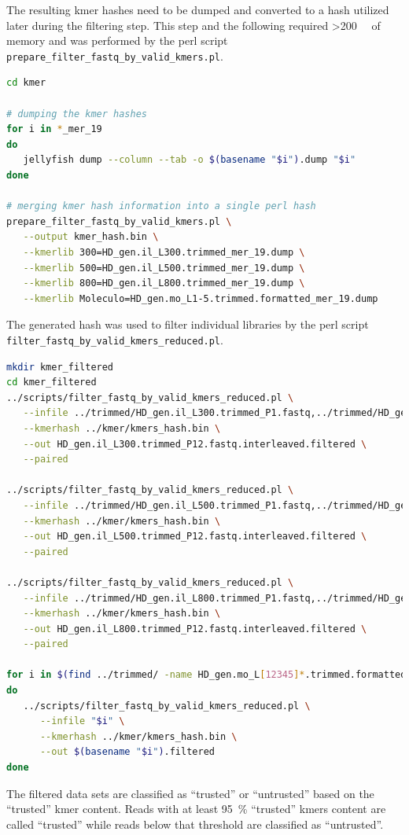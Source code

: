 \documentclass[12pt,a4paper]{scrartcl}
\begin{document}
The resulting kmer hashes need to be dumped and converted to a hash
utilized later during the filtering step. This step and the following
required \SI{>200}{\giga\byte} of memory and was performed by the perl
script \texttt{prepare\_filter\_fastq\_by\_valid\_kmers.pl}.

\begin{lstlisting}[language=bash]
cd kmer

# dumping the kmer hashes
for i in *_mer_19
do
   jellyfish dump --column --tab -o $(basename "$i").dump "$i"
done

# merging kmer hash information into a single perl hash
prepare_filter_fastq_by_valid_kmers.pl \
   --output kmer_hash.bin \
   --kmerlib 300=HD_gen.il_L300.trimmed_mer_19.dump \
   --kmerlib 500=HD_gen.il_L500.trimmed_mer_19.dump \
   --kmerlib 800=HD_gen.il_L800.trimmed_mer_19.dump \
   --kmerlib Moleculo=HD_gen.mo_L1-5.trimmed.formatted_mer_19.dump
\end{lstlisting}

The generated hash was used to filter individual libraries by the perl
script \texttt{filter\_fastq\_by\_valid\_kmers\_reduced.pl}.

\begin{lstlisting}[language=bash]
mkdir kmer_filtered
cd kmer_filtered
../scripts/filter_fastq_by_valid_kmers_reduced.pl \
   --infile ../trimmed/HD_gen.il_L300.trimmed_P1.fastq,../trimmed/HD_gen.il_L300.trimmed_P2.fastq \
   --kmerhash ../kmer/kmers_hash.bin \
   --out HD_gen.il_L300.trimmed_P12.fastq.interleaved.filtered \
   --paired

../scripts/filter_fastq_by_valid_kmers_reduced.pl \
   --infile ../trimmed/HD_gen.il_L500.trimmed_P1.fastq,../trimmed/HD_gen.il_L500.trimmed_P2.fastq \
   --kmerhash ../kmer/kmers_hash.bin \
   --out HD_gen.il_L500.trimmed_P12.fastq.interleaved.filtered \
   --paired

../scripts/filter_fastq_by_valid_kmers_reduced.pl \
   --infile ../trimmed/HD_gen.il_L800.trimmed_P1.fastq,../trimmed/HD_gen.il_L800.trimmed_P2.fastq \
   --kmerhash ../kmer/kmers_hash.bin \
   --out HD_gen.il_L800.trimmed_P12.fastq.interleaved.filtered \
   --paired

for i in $(find ../trimmed/ -name HD_gen.mo_L[12345]*.trimmed.formatted.fastq)
do
   ../scripts/filter_fastq_by_valid_kmers_reduced.pl \
      --infile "$i" \
      --kmerhash ../kmer/kmers_hash.bin \
      --out $(basename "$i").filtered
done
\end{lstlisting}

The filtered data sets are classified as ``trusted'' or ``untrusted''
based on the ``trusted'' kmer content. Reads with at least
\SI{95}{\percent} ``trusted'' kmers content are called ``trusted''
while reads below that threshold are classified as ``untrusted''.
\end{document}
